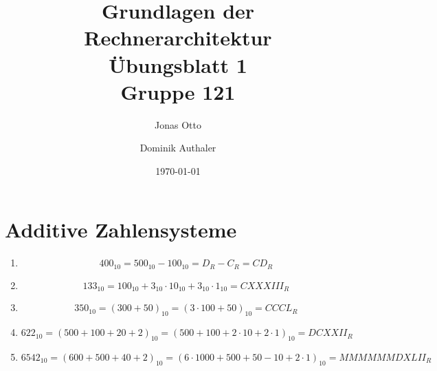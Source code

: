 \documentclass[a4paper]{article}
\title{Grundlagen der Rechnerarchitektur\\ Übungsblatt 1\\Gruppe 121\\}
\author{ Jonas Otto\\ \and Dominik Authaler \\ 
}
\date{\today}
\begin{document}
\maketitle

\section{Additive Zahlensysteme}

\begin{enumerate}[label=\Roman*)]
    \item
        \begin{equation*}
            400_{10} = 500_{10} - 100_{10} = D_R - C_R = \textit{CD}_R
        \end{equation*}
    \item
        \begin{equation*}
            133_{10} = 100_{10} + 3_{10} \cdot 10_{10} + 3_{10} \cdot 1_{10} = \textit{CXXXIII}_R
        \end{equation*}
    \item  
        \begin{equation*}
        	350_{10} = (300 + 50)_{10} = (3 \cdot 100 + 50)_{10} = \textit{CCCL}_R
        \end{equation*}	
    \item 
        \begin{equation*}
        622_{10} = (500 + 100 + 20 + 2)_{10} = (500 + 100 + 2 \cdot 10 + 2 \cdot 1)_{10} = \textit{DCXXII}_R
        \end{equation*}	
    \item 
    	\begin{equation*}
    	6542_{10} = (600 + 500 + 40 + 2)_{10} = (6 \cdot 1000 + 500 + 50 	- 10 + 2 \cdot 1)_{10} = \textit{MMMMMMDXLII}_R
        \end{equation*}
\end{enumerate}
\end{document}
